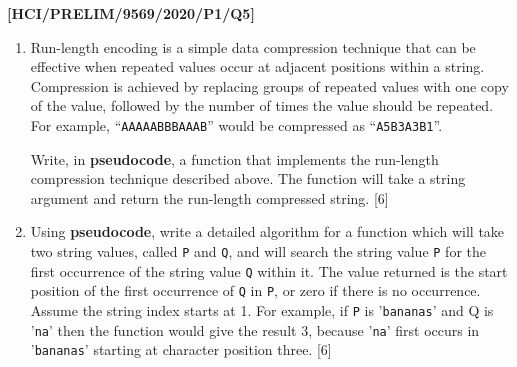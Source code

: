 \item \textbf{{[}HCI/PRELIM/9569/2020/P1/Q5{]} }
\begin{enumerate}
\item Run-length encoding is a simple data compression technique that can
be effective when repeated values occur at adjacent positions within
a string. Compression is achieved by replacing groups of repeated
values with one copy of the value, followed by the number of times
the value should be repeated. For example, \textquotedblleft \texttt{AAAAABBBAAAB}\textquotedblright{}
would be compressed as \textquotedblleft \texttt{A5B3A3B1}\textquotedblright . 

Write, in \textbf{pseudocode}, a function that implements the run-length
compression technique described above. The function will take a string
argument and return the run-length compressed string. \hfill{}{[}6{]}
\item Using \textbf{pseudocode}, write a detailed algorithm for a function
which will take two string values, called \texttt{P} and \texttt{Q},
and will search the string value \texttt{P} for the first occurrence
of the string value \texttt{Q} within it. The value returned is the
start position of the first occurrence of \texttt{Q} in \texttt{P},
or zero if there is no occurrence. Assume the string index starts
at 1. For example, if \texttt{P} is '\texttt{bananas}' and Q is '\texttt{na}'
then the function would give the result 3, because '\texttt{na}' first
occurs in '\texttt{bananas}' starting at character position three.
{[}6{]}
\end{enumerate}